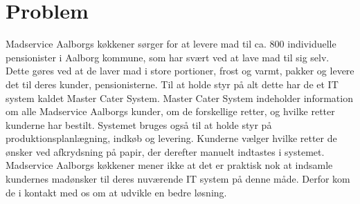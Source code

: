 \chapter{Problem}
Madservice Aalborgs køkkener sørger for at levere mad til ca. 800 individuelle pensionister i Aalborg kommune, som har svært ved at lave mad til sig selv.
Dette gøres ved at de laver mad i store portioner, frost og varmt, pakker og levere det til deres kunder, pensionisterne.
Til at holde styr på alt dette har de et IT system kaldet Master Cater System.
Master Cater System indeholder information om alle Madservice Aalborgs kunder, om de forskellige retter, og hvilke retter kunderne har bestilt.
Systemet bruges også til at holde styr på produktionsplanlægning, indkøb og levering.
Kunderne vælger hvilke retter de ønsker ved afkrydsning på papir, der derefter manuelt indtastes i systemet.
Madservice Aalborgs køkkener mener ikke at det er praktisk nok at indsamle kundernes madønsker til deres nuværende IT system på denne måde.
Derfor kom de i kontakt med os om at udvikle en bedre løsning.





